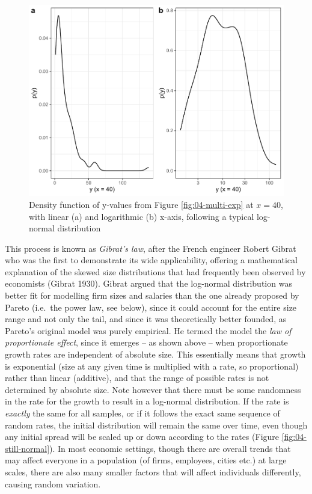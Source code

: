 \documentclass[
  12pt,
  a4paper, twoside]{book}
\begin{document}
\begin{figure}

{\centering \includegraphics[width=0.9\linewidth]{bookdown-demo_files/figure-latex/04-lnorm-exp-1} 

}

\caption[Log-normal distribution resulting from many exponentials with randomly fluctuating rates]{Density function of y-values from Figure \ref{fig:04-multi-exp} at \(x = 40\), with linear (a) and logarithmic (b) x-axis, following a typical log-normal distribution}\label{fig:04-lnorm-exp}
\end{figure}

This process is known as \emph{Gibrat's law}, after the French engineer Robert Gibrat who was the first to demonstrate its wide applicability, offering a mathematical explanation of the skewed size distributions that had frequently been observed by economists (Gibrat 1930). Gibrat argued that the log-normal distribution was better fit for modelling firm sizes and salaries than the one already proposed by Pareto (i.e.~the power law, see below), since it could account for the entire size range and not only the tail, and since it was theoretically better founded, as Pareto's original model was purely empirical. He termed the model the \emph{law of proportionate effect}, since it emerges -- as shown above -- when proportionate growth rates are independent of absolute size. This essentially means that growth is exponential (size at any given time is multiplied with a rate, so proportional) rather than linear (additive), and that the range of possible rates is not determined by absolute size. Note however that there must be some randomness in the rate for the growth to result in a log-normal distribution. If the rate is \emph{exactly} the same for all samples, or if it follows the exact same sequence of random rates, the initial distribution will remain the same over time, even though any initial spread will be scaled up or down according to the rates (Figure \ref{fig:04-still-normal}). In most economic settings, though there are overall trends that may affect everyone in a population (of firms, employees, cities etc.) at large scales, there are also many smaller factors that will affect individuals differently, causing random variation.
\end{document}
